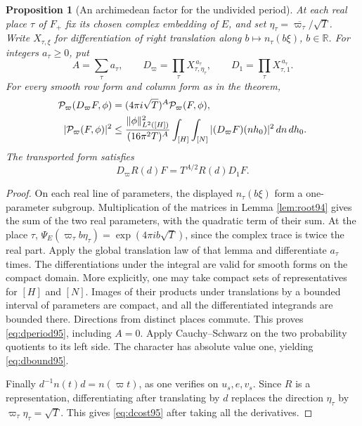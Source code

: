 \documentclass[a4paper,11pt]{article}
\newtheorem{proposition}{Proposition}[section]
\theoremstyle{definition}
\theoremstyle{remark}
\newcommand{\RR}{\mathbb R}\newcommand{\CC}{\mathbb C}\newcommand{\QQ}{\mathbb Q}
\numberwithin{equation}{section}
\begin{document}
\begin{proposition}[An archimedean factor for the undivided period]
\label{prop:der95}
At each real place \(\tau\) of \(F_+\) fix its chosen complex
embedding of \(E\), and set
\(\eta_\tau=\overline{\varpi_\tau}/\sqrt T\). Write
\(X_{\tau,\xi}\) for differentiation of right translation along
\(b\mapsto n_\tau(b\xi)\), \(b\in\RR\). For integers
\(a_\tau\ge0\), put
\[
 A=\sum_\tau a_\tau,\qquad
 D_{\varpi}=\prod_\tau X_{\tau,\eta_\tau}^{\,a_\tau},\qquad
 D_1=\prod_\tau X_{\tau,1}^{\,a_\tau}.
\]
For every smooth row form and column form as in the theorem,
\begin{align}
 {\cal P}_{\varpi}(D_{\varpi}F,\phi)
       &=(4\pi i\sqrt T)^A{\cal P}_{\varpi}(F,\phi),
          \label{eq:dperiod95}\\
 |{\cal P}_{\varpi}(F,\phi)|^2
       &\le \frac{\|\phi\|_{L^2([H])}^2}{(16\pi^2 T)^A}
              \int_{[H]}\int_{[N]} |(D_{\varpi}F)(nh_0)|^2\,dn\,dh_0 .
          \label{eq:dbound95}
\end{align}
The transported form satisfies
\begin{equation}
              D_{\varpi}R(d)F=T^{A/2}R(d)D_1F .   \label{eq:dcost95}
\end{equation}
\end{proposition}
\begin{proof}
On each real line of parameters, the displayed \(n_\tau(b\xi)\)
form a one-parameter subgroup. Multiplication of the matrices in
Lemma \ref{lem:root94} gives the sum of the two real parameters,
with the quadratic term of their sum. At the place \(\tau\),
\(\Psi_E(\varpi_\tau b\eta_\tau)=\exp(4\pi i b\sqrt T)\),
since the complex trace is twice the real part. Apply the global
translation law of that lemma and differentiate \(a_\tau\) times.
The differentiations under the integral are valid for smooth
forms on the compact domain. More explicitly, one may take compact
sets of representatives for \([H]\) and \([N]\). Images of their
products under translations by a bounded interval of parameters
are compact, and all the differentiated integrands are bounded
there. Directions from distinct places commute. This proves
\eqref{eq:dperiod95}, including \(A=0\).
Apply Cauchy--Schwarz on the two probability quotients to its left
side. The character has absolute value one, yielding
\eqref{eq:dbound95}.

Finally \(d^{-1} n(t)d=n(\varpi t)\), as one verifies on \(u_s,e,v_s\).
Since \(R\) is a representation, differentiating after translating
by \(d\) replaces the direction \(\eta_\tau\) by
\(\varpi_\tau\eta_\tau=\sqrt T\). This gives
\eqref{eq:dcost95} after taking all the derivatives.
\end{proof}
\end{document}
